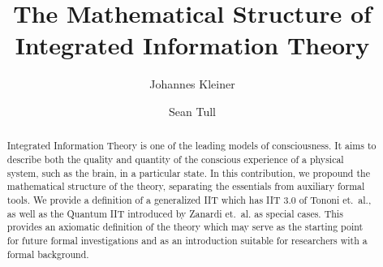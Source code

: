 \documentclass[reqno]{amsart}
\title[The Mathematical Structure of IIT]{The Mathematical Structure of Integrated Information Theory}
\author{Johannes Kleiner}
\author{Sean Tull}
\begin{document}
\begin{abstract}
Integrated Information Theory is one of the leading models of consciousness. It aims to describe both the quality and quantity of the conscious experience of a physical system, such as the brain, in a particular state. In this contribution, we propound the mathematical structure of the theory, separating the essentials from auxiliary formal tools. We provide a definition of a generalized IIT which has IIT 3.0 of Tononi et.~al., as well as the Quantum IIT introduced by Zanardi et.~al. as special cases. This provides an axiomatic definition of the theory which may serve as the starting point for future formal investigations and as an introduction suitable for researchers with a formal background.
\end{abstract}

\maketitle











\end{document}
